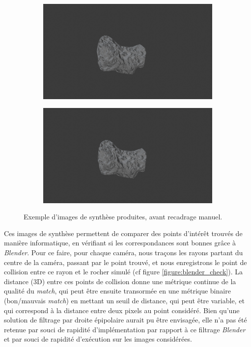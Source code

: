 \documentclass[
	a4paper, %
	10pt, %
	unnumberedsections, %
	twoside, %
]{LTJournalArticle}
\begin{document}
\begin{figure}[H]
	\centering
	\begin{subfigure}[H]{\columnwidth}
		\centering
		\includegraphics[width=\textwidth]{images/rocks_2_10_deg_higher_distance_left.png}
	\end{subfigure}
	\begin{subfigure}[H]{\columnwidth}
		\centering
		\includegraphics[width=\textwidth]{images/rocks_2_10_deg_higher_distance_right.png}
	\end{subfigure}
	\caption{Exemple d'images de synthèse produites, avant recadrage manuel.}
	\label{figure:blender_example}
\end{figure}

Ces images de synthèse permettent de comparer des points d'intérêt trouvés de manière informatique, en vérifiant si les correspondances sont bonnes grâce à \textit{Blender}.
Pour ce faire, pour chaque caméra, nous traçons les rayons partant du centre de la caméra, passant par le point trouvé, et nous enregistrons le point de collision entre ce rayon et le rocher simulé (cf figure \ref{figure:blender_check}).
La distance (3D) entre ces points de collision donne une métrique continue de la qualité du \textit{match}, qui peut être ensuite transormée en une métrique binaire (bon/mauvais \textit{match}) en mettant un seuil de distance, qui peut être variable, et qui correspond à la distance entre deux pixels au point considéré.
Bien qu'une solution de filtrage par droite épipolaire aurait pu être envisagée, elle n'a pas été retenue par souci de rapidité d'implémentation par rapport à ce filtrage \textit{Blender} et par souci de rapidité d'exécution sur les images considérées.
\end{document}
